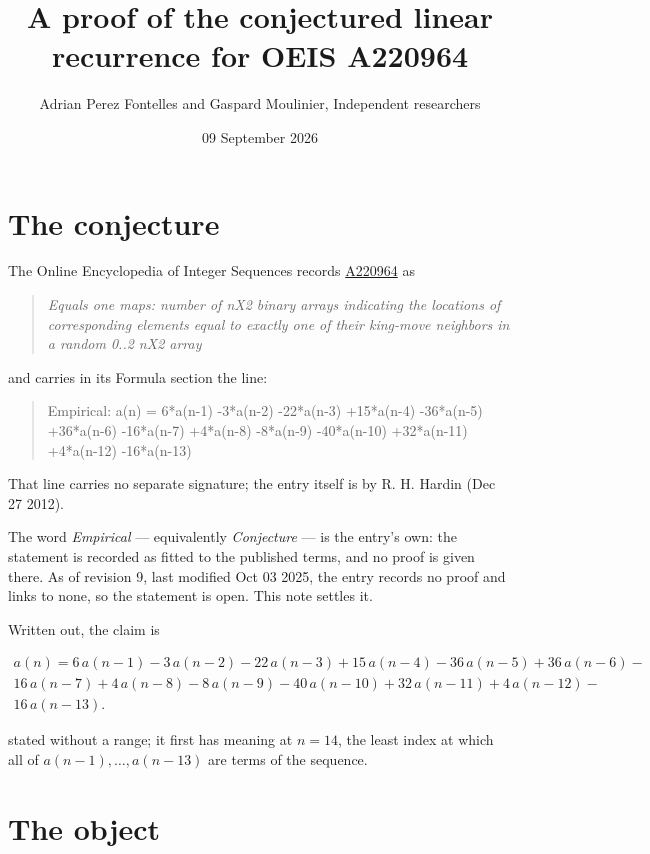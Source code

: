 \documentclass[11pt]{article}
\title{A proof of the conjectured linear recurrence for OEIS A220964}
\author{Adrian Perez Fontelles and Gaspard Moulinier, Independent researchers}
\date{09 September 2026}
\theoremstyle{definition}
\begin{document}
\maketitle
\section{The conjecture}

The Online Encyclopedia of Integer Sequences records \href{https://oeis.org/A220964}{A220964} as

\begin{quote}\itshape Equals one maps: number of nX2 binary arrays indicating the locations of corresponding elements equal to exactly one of their king-move neighbors in a random 0..2 nX2 array\end{quote}

and carries in its Formula section the line:

\begin{quote}\ttfamily Empirical: a(n) = 6*a(n-1) -3*a(n-2) -22*a(n-3) +15*a(n-4) -36*a(n-5) +36*a(n-6) -16*a(n-7) +4*a(n-8) -8*a(n-9) -40*a(n-10) +32*a(n-11) +4*a(n-12) -16*a(n-13)\end{quote}

That line carries no separate signature; the entry itself is by R. H. Hardin (Dec 27 2012).

The word {\itshape Empirical} --- equivalently {\itshape Conjecture} --- is the entry's own: the statement is recorded as fitted to the published terms, and no proof is given there. As of revision 9, last modified Oct 03 2025, the entry records no proof and links to none, so the statement is open. This note settles it.

Written out, the claim is

\begin{multline*} a(n) = 6\,a(n-1) - 3\,a(n-2) - 22\,a(n-3) + 15\,a(n-4) - 36\,a(n-5) + 36\,a(n-6) - \\ 16\,a(n-7) + 4\,a(n-8) - 8\,a(n-9) - 40\,a(n-10) + 32\,a(n-11) + 4\,a(n-12) - \\ 16\,a(n-13). \end{multline*}

stated without a range; it first has meaning at $n = 14$, the least index at which all of $a(n-1),\dots,a(n-13)$ are terms of the sequence.

\section{The object}
\end{document}
